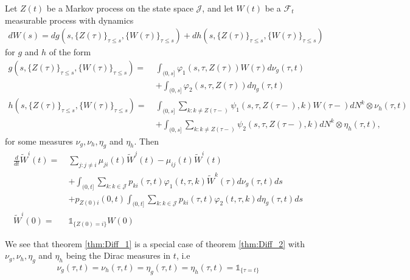 \documentclass[12pt]{article}
\newcommand{\indic}[1]{\mathds{1}_{ \{ #1 \} }}
\theoremstyle{my_thm}
\newenvironment{thm}
  {\pushQED{\qed}\renewcommand{\qedsymbol}{$\Circle$}\thmx}
  {\popQED\endthmx}
\theoremstyle{my_rem}
\begin{document}
\begin{thm}[]
\label{thm:Diff_2}
Let $Z(t)$ be a Markov process on the state space $\mathcal{J}$, and let $W(t)$ be a $\mathcal{F}_t$ measurable process with dynamics
\begin{align*}
dW(s)= d g(s,\{Z(\tau)\}_{\tau\leq s},\{W(\tau)\}_{\tau\leq s})+
 d h(s,\{Z(\tau)\}_{\tau\leq s},\{W(\tau)\}_{\tau\leq s})
\end{align*}
for $g$ and $h$ of the form
\begin{align*}
g(s,\{Z(\tau)\}_{\tau\leq s},\{W(\tau)\}_{\tau\leq s})= \ &\int_{(0,s]} \varphi_1(s,\tau,Z(\tau))W(\tau) d\nu_g(\tau,t)
\\
&+
\int_{(0,s]} \varphi_2(s,\tau,Z(\tau)) d\eta_g(\tau,t)
\\
h(s,\{Z(\tau)\}_{\tau\leq s},\{W(\tau)\}_{\tau\leq s})= \ &\int_{(0,s]} \sum_{k:k\neq Z(\tau-)} \psi_1(s,\tau,Z(\tau-),k) W(\tau-)  dN^k\otimes\nu_h(\tau,t)
\\
&+
\int_{(0,s]} \sum_{k:k\neq Z(\tau-)} \psi_2(s,\tau,Z(\tau-),k)  dN^k\otimes\eta_h(\tau,t),
\end{align*}
for some measures $\nu_g,\nu_h,\eta_g$ and $\eta_h$.
Then
\begin{align*}
\frac{d}{dt}\tilde{W}^i(t)= \ &
\sum_{j:j \neq i} \mu_{ji}(t) \tilde{W}^j(t)-\mu_{ij}(t)\tilde{W}^i(t)
\\
&+
\int_{(0,t]} \sum_{k:k \in \mathcal{J}} p_{ki}(\tau,t) \varphi_1(t,\tau,k) \tilde{W}^k(\tau) d\nu_g(\tau,t) ds
\\
&+
p_{Z(0)i}(0,t)\int_{(0,t]} \sum_{k:k \in \mathcal{J}} p_{ki}(\tau,t) \varphi_2(t,\tau,k) d\eta_g(\tau,t) ds
\\
\tilde{W}^i(0)= \ &\indic{Z(0)=i}W(0)
\end{align*}

\end{thm}
We see that theorem \ref{thm:Diff_1} is a special case of theorem \ref{thm:Diff_2} with $\nu_g,\nu_h,\eta_g$ and $\eta_h$ being the Dirac measures in $t$, i.e 
$$
\nu_g(\tau,t)=\nu_h(\tau,t)=\eta_g(\tau,t)=\eta_h(\tau,t)=\indic{\tau=t}
$$
\end{document}
